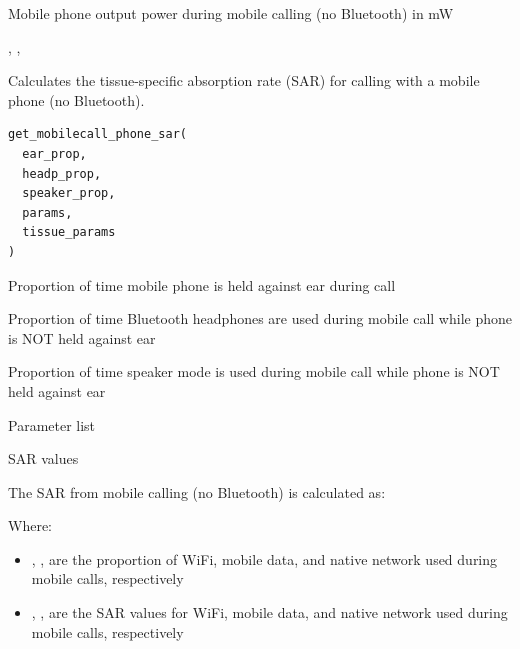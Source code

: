 \documentclass[a4paper]{book}
\begin{document}
%
\begin{Value}
Mobile phone output power during mobile calling (no Bluetooth) in mW
\end{Value}
%
\begin{SeeAlso}
, , 
\end{SeeAlso}
%
\begin{Description}
Calculates the tissue-specific absorption rate (SAR) for calling with a mobile phone (no Bluetooth).
\end{Description}
%
\begin{Usage}
\begin{verbatim}
get_mobilecall_phone_sar(
  ear_prop,
  headp_prop,
  speaker_prop,
  params,
  tissue_params
)
\end{verbatim}
\end{Usage}
%
\begin{Arguments}
\begin{ldescription}
\item[\code{ear\_prop}] Proportion of time mobile phone is held against ear during call

\item[\code{headp\_prop}] Proportion of time Bluetooth headphones are used during mobile call while phone is NOT held against ear

\item[\code{speaker\_prop}] Proportion of time speaker mode is used during mobile call while phone is NOT held against ear

\item[\code{params}] Parameter list

\item[\code{tissue\_params}] SAR values
\end{ldescription}
\end{Arguments}
%
\begin{Details}
The SAR from mobile calling (no Bluetooth) is calculated as:

Where:
\begin{itemize}

\item{} , ,  are the proportion of WiFi, mobile data, and native network used during mobile calls, respectively
\item{} , ,  are the SAR values for WiFi, mobile data, and native network used during mobile calls, respectively

\end{itemize}

\end{Details}
\end{document}
